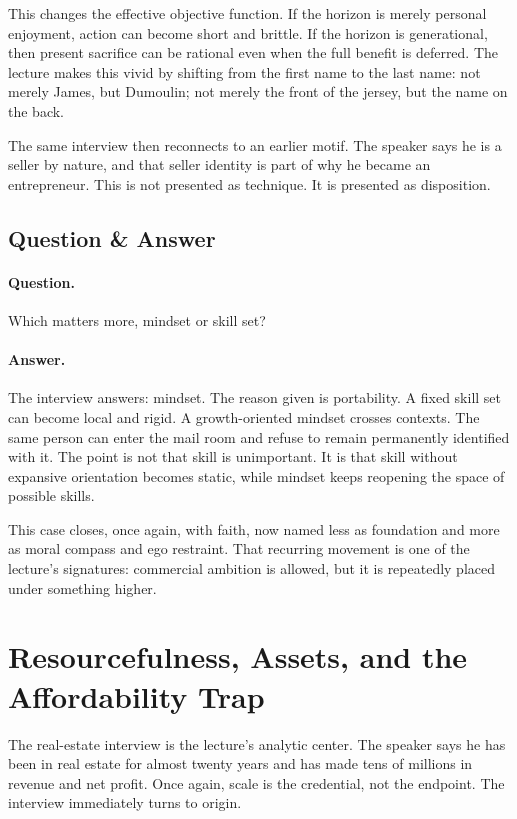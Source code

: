 This changes the effective objective function. If the horizon is merely personal enjoyment, action can become short and brittle. If the horizon is generational, then present sacrifice can be rational even when the full benefit is deferred. The lecture makes this vivid by shifting from the first name to the last name: not merely James, but Dumoulin; not merely the front of the jersey, but the name on the back.

The same interview then reconnects to an earlier motif. The speaker says he is a seller by nature, and that seller identity is part of why he became an entrepreneur. This is not presented as technique. It is presented as disposition.

\subsection{Question \& Answer}

\paragraph{Question.} Which matters more, mindset or skill set?

\paragraph{Answer.} The interview answers: mindset. The reason given is portability. A fixed skill set can become local and rigid. A growth-oriented mindset crosses contexts. The same person can enter the mail room and refuse to remain permanently identified with it. The point is not that skill is unimportant. It is that skill without expansive orientation becomes static, while mindset keeps reopening the space of possible skills.

This case closes, once again, with faith, now named less as foundation and more as moral compass and ego restraint. That recurring movement is one of the lecture's signatures: commercial ambition is allowed, but it is repeatedly placed under something higher.

\section{Resourcefulness, Assets, and the Affordability Trap}

The real-estate interview is the lecture's analytic center. The speaker says he has been in real estate for almost twenty years and has made tens of millions in revenue and net profit. Once again, scale is the credential, not the endpoint. The interview immediately turns to origin.

